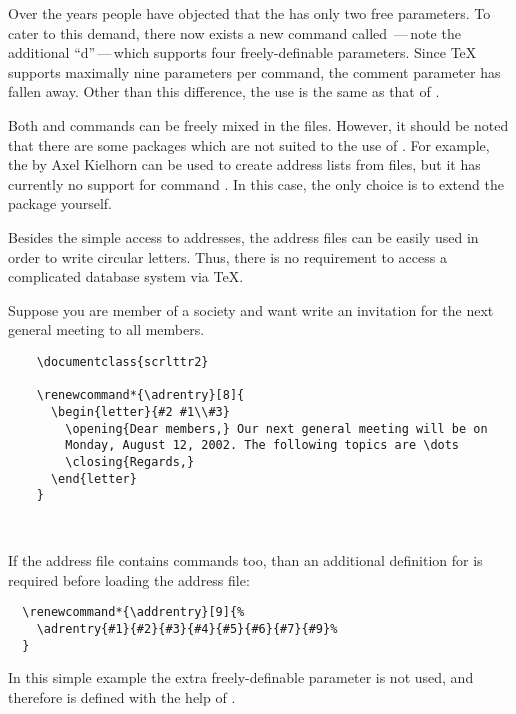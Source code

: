 %
\begin{Declaration}
\end{Declaration}%
%
Over the years people have objected that the  has only
two free parameters. To cater to this demand, there now exists a new
command called \,---\,note the additional
``d''\,---\,which supports four freely-definable parameters. Since
{\TeX} supports maximally nine parameters per command, the comment
parameter has fallen away. Other than this difference, the use is the
same as that of .

Both  and  commands can be freely
mixed in the  files. However, it should be noted that there
are some packages which are not suited to the use of
.  For example, the  by Axel
Kielhorn can be used to create address lists from  files,
but it has currently no support for command .  In
this case, the only choice is to extend the package yourself.
%

Besides the simple access to addresses, the address files can be
easily used in order to write circular letters.  Thus, there is no
requirement to access a complicated database system via {\TeX}.
%
\begin{Example}
  Suppose you are member of a society and want write an invitation for
  the next general meeting to all members.
  \begin{lstlisting}
    \documentclass{scrlttr2}
    
    \renewcommand*{\adrentry}[8]{
      \begin{letter}{#2 #1\\#3}
        \opening{Dear members,} Our next general meeting will be on
        Monday, August 12, 2002. The following topics are \dots
        \closing{Regards,}
      \end{letter}
    }
    
  
\end{lstlisting}
If the address file contains  commands too, than an
additional definition for  is required before loading
the address file:
\begin{lstlisting}
  \renewcommand*{\addrentry}[9]{%
    \adrentry{#1}{#2}{#3}{#4}{#5}{#6}{#7}{#9}%
  }
\end{lstlisting}
In this simple example the extra freely-definable parameter is not
used, and therefore  is defined with the help of
.
\end{Example}

